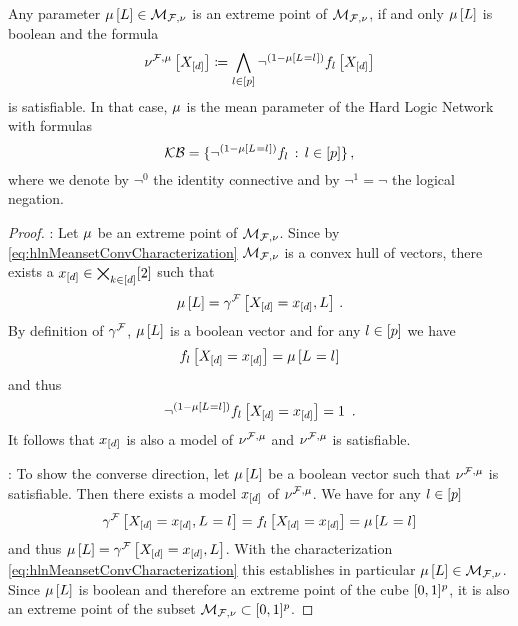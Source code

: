 \begin{theorem}\label{the:extremeCharacterizationHLN}
	Any parameter $\mu\left[L\right]\in\mathcal{M}_{\mathcal{F},\nu}$ is an extreme point of $\mathcal{M}_{\mathcal{F},\nu}$, if and only $\mu\left[L\right]$ is boolean and the formula
			\[ \nu^{\mathcal{F},\mu}\left[X_{[d]}\right] 
			\coloneqq \bigwedge_{l\in[p]} \lnot^{(1-\mu\left[L_{}=l_{}\right])} f_{l}\left[X_{[d]}\right] \]
	is satisfiable.
	In that case, $\mu$ is the mean parameter of the Hard Logic Network with formulas
		\[ \mathcal{KB}=\{\lnot^{(1-\mu\left[L_{}=l_{}\right])} f_{l} \, : \, l\in[p] \} \, , \]
	where we denote by $\lnot^0$ the identity connective and by $\lnot^1=\lnot$ the logical negation.
\end{theorem}
\begin{proof}
	\proofrightsymbol: Let $\mu$ be an extreme point of $\mathcal{M}_{\mathcal{F},\nu}$. 
		Since by \eqref{eq:hlnMeansetConvCharacterization} $\mathcal{M}_{\mathcal{F},\nu}$ is a convex hull of vectors, there exists a $x_{[d]}\in\bigtimes_{k\in[d]}[2]$ such that
			\[ \mu\left[L\right] = \gamma^{\mathcal{F}}\left[X_{[d]}=x_{[d]},L\right]  \, . \]
		By definition of $\gamma^{\mathcal{F}}$, $\mu\left[L\right]$ is a boolean vector and for any $l\in[p]$ we have
			\[ f_{l}\left[X_{[d]}=x_{[d]}\right] = \mu\left[L_{}=l_{}\right] \]
		and thus
			\[ \lnot^{(1-\meanparamat{\indexedselvariable})} \enumformulaat{\indexedshortcatvariables} = 1 \, .  \]
		It follows that $x_{[d]}$ is also a model of $\nu^{\mathcal{F},\mu}$ and $\nu^{\mathcal{F},\mu}$ is satisfiable.
			
	\proofleftsymbol: To show the converse direction, let $\mu\left[L\right]$ be a boolean vector such that $\nu^{\mathcal{F},\mu}$ is satisfiable.
		Then there exists a model $x_{[d]}$ of $\nu^{\mathcal{F},\mu}$.
		We have for any $l\in[p]$ 
			\[ \gamma^{\mathcal{F}}\left[X_{[d]}=x_{[d]},L_{}=l_{}\right] =  f_{l}\left[X_{[d]}=x_{[d]}\right] = \mu\left[L_{}=l_{}\right] \]
		and thus $\mu\left[L\right]=\gamma^{\mathcal{F}}\left[X_{[d]}=x_{[d]},L\right]$.
		With the characterization \eqref{eq:hlnMeansetConvCharacterization} this establishes in particular $\mu\left[L\right]\in\mathcal{M}_{\mathcal{F},\nu}$.		
		Since $\mu\left[L\right]$ is boolean and therefore an extreme point of the cube $[0,1]^{p}$, it is also an extreme point of the subset $\mathcal{M}_{\mathcal{F},\nu}\subset[0,1]^{p}$.
\end{proof}

